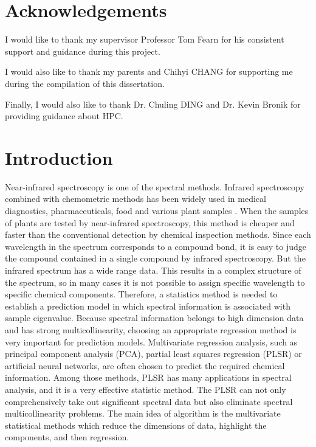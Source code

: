 \documentclass[a4paper,12pt,titlepage]{article} %
\numberwithin{equation}{section}  %
\begin{document}
	\section{Acknowledgements} 
 I would like to thank my supervisor Professor Tom Fearn for his consistent support and guidance during this project. 
 
 I would also like to thank my parents and Chihyi CHANG for supporting me during the compilation of this dissertation. 
 

 Finally, I would also like to thank Dr. Chuling DING and Dr. Kevin Bronik for providing guidance about HPC. 
 
 
 	
 	
	\newpage           %
	
	\tableofcontents   %
	\newpage           %
	

	
	\section{Introduction}             %
	\label{sec:intro}                  %
	
	Near-infrared spectroscopy is one of the spectral methods. Infrared spectroscopy combined with chemometric methods has been widely used in medical diagnostics, pharmaceuticals, food and various plant samples \citep{1su2006partial}. When the samples of plants are tested by near-infrared spectroscopy, this method is cheaper and faster than the conventional detection by chemical inspection methods. Since each wavelength in the spectrum corresponds to a compound bond, it is easy to judge the compound contained in a single compound by infrared spectroscopy. But the infrared spectrum has a wide range data. This results in a complex structure of the spectrum, so in many cases it is not possible to assign specific wavelength to specific chemical components. Therefore, a statistics method is needed to establish a prediction model in which spectral information is associated with sample eigenvalue. Because spectral information belongs to high dimension data and has strong multicollinearity, choosing an appropriate regression method is very important for prediction models. Multivariate regression analysis, such as principal component analysis (PCA), partial least squares regression (PLSR) or artificial neural networks, are often chosen to predict the required chemical information. Among those methods, PLSR has many applications in spectral analysis, and it is a very effective statistic method. The PLSR can not only comprehensively take out significant spectral data but also eliminate spectral multicollinearity problems. The main idea of algorithm is the multivariate statistical methods which reduce the dimensions of data, highlight the components, and then regression.
	
\end{document}
